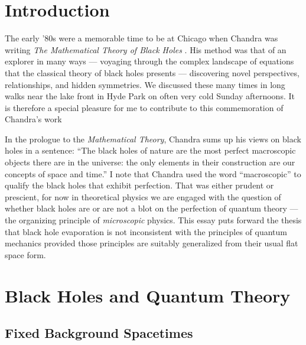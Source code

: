 
\pacs{}


\setcounter{footnote}{0}
\section{Introduction}
\label{sec:intro}

The early '80s were a memorable time to be at Chicago when 
Chandra was writing {\sl The Mathematical Theory of Black Holes}
\cite{Cha83}.  His method was that of an explorer in many ways ---
voyaging through the complex landscape of equations that the classical
theory of black holes presents --- discovering novel perspectives,
relationships, and hidden symmetries.  We discussed these many times in
long walks near the lake front in Hyde Park on often very cold Sunday
afternoons. It is therefore a special pleasure for me to contribute to
this commemoration of Chandra's work 

In the prologue to the {\sl Mathematical Theory}, Chandra sums up his
views on black holes in a sentence: ``The black holes of nature are the
most perfect macroscopic objects there are in the universe: the
only elements in their construction are our concepts of space and time.''
I note that Chandra used the word
``macroscopic'' to qualify the black holes that exhibit perfection. That
was either prudent or prescient, for now in theoretical physics we are
engaged with the question of whether black holes are or are not a blot
on the perfection of quantum theory --- the organizing principle of {\it
microscopic} physics. This essay puts forward the thesis that black
hole evaporation is not inconsistent with the principles of quantum
mechanics provided those principles are suitably generalized from their
usual flat space form.

\section{Black Holes and Quantum Theory}
\label{sec:II}
\subsection{Fixed Background Spacetimes}
\label{subsec:A}

